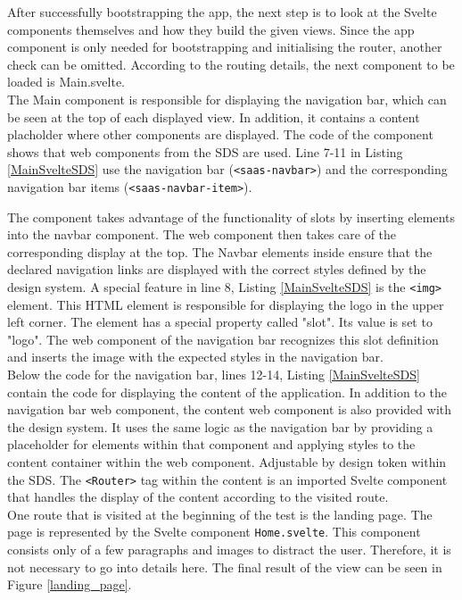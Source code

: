 After successfully bootstrapping the app, the next step is to look at the Svelte components themselves and how they build the given views. Since the app component is only needed for bootstrapping and initialising the router, another check can be omitted. According to the routing details, the next component to be loaded is Main.svelte. \\
The Main component is responsible for displaying the navigation bar, which can be seen at the top of each displayed view. In addition, it contains a content placholder where other components are displayed. The code of the component shows that web components from the \ac{SDS} are used. Line 7-11 in Listing \ref{MainSvelteSDS} use the navigation bar (\texttt{<saas-navbar>}) and the corresponding navigation bar items (\texttt{<saas-navbar-item>}).

The component takes advantage of the functionality of slots by inserting elements into the navbar component. The web component then takes care of the corresponding display at the top. The Navbar elements inside ensure that the declared navigation links are displayed with the correct styles defined by the design system. A special feature in line 8, Listing \ref{MainSvelteSDS} is the \texttt{<img>} element. This HTML element is responsible for displaying the logo in the upper left corner. The element has a special property called "slot". Its value is set to "logo". The web component of the navigation bar recognizes this slot definition and inserts the image with the expected styles in the navigation bar. \\
Below the code for the navigation bar, lines 12-14, Listing \ref{MainSvelteSDS} contain the code for displaying the content of the application. In addition to the navigation bar web component, the content web component is also provided with the design system. It uses the same logic as the navigation bar by providing a placeholder for elements within that component and applying styles to the content container within the web component. Adjustable by design token within the SDS. The \texttt{<Router>} tag within the content is an imported Svelte component that handles the display of the content according to the visited route. \\
One route that is visited at the beginning of the test is the landing page. The page is represented by the Svelte component \texttt{Home.svelte}. This component consists only of a few paragraphs and images to distract the user. Therefore, it is not necessary to go into details here. The final result of the view can be seen in Figure \ref{landing_page}.\\

